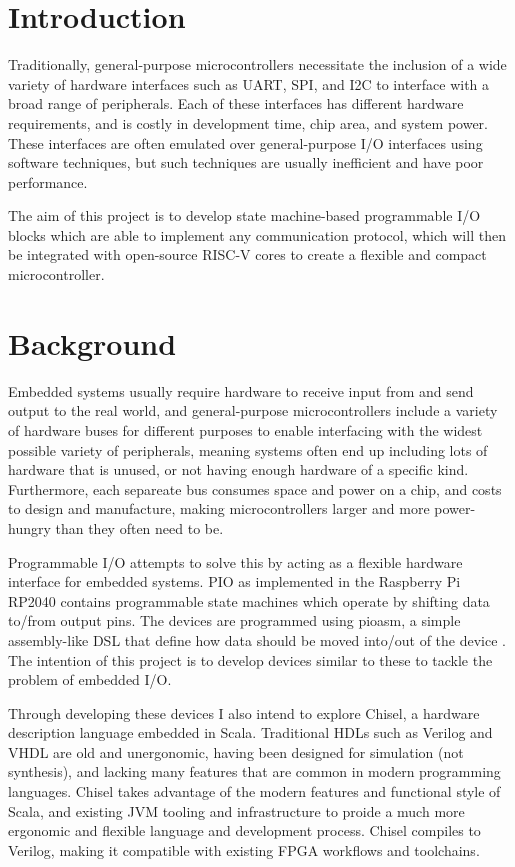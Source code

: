\documentclass[a4paper,fleqn,12pt]{article}
\begin{document}


\pagestyle{plain}

\section{Introduction}

Traditionally, general-purpose microcontrollers necessitate the inclusion of a wide variety of hardware interfaces such as UART, SPI, and I2C to interface with a broad range of peripherals. Each of these interfaces has different hardware requirements, and is costly in development time, chip area, and system power. These interfaces are often emulated over general-purpose I/O interfaces using software techniques, but such techniques are usually inefficient and have poor performance.

The aim of this project is to develop state machine-based programmable I/O blocks which are able to implement any communication protocol, which will then be integrated with open-source RISC-V cores to create a flexible and compact microcontroller.

\section{Background}

Embedded systems usually require hardware to receive input from and send output to the real world, and general-purpose microcontrollers include a variety of hardware buses for different purposes to enable interfacing with the widest possible variety of peripherals, meaning systems often end up including lots of hardware that is unused, or not having enough hardware of a specific kind. Furthermore, each separeate bus consumes space and power on a chip, and costs to design and manufacture, making microcontrollers larger and more power-hungry than they often need to be.

Programmable I/O attempts to solve this by acting as a flexible hardware interface for embedded systems. PIO as implemented in the Raspberry Pi RP2040 contains programmable state machines which operate by shifting data to/from output pins. The devices are programmed using pioasm, a simple assembly-like DSL that define how data should be moved into/out of the device \cite{rp2040}. The intention of this project is to develop devices similar to these to tackle the problem of embedded I/O.

Through developing these devices I also intend to explore Chisel, a hardware description language embedded in Scala. Traditional HDLs such as Verilog and VHDL are old and unergonomic, having been designed for simulation (not synthesis), and lacking many features that are common in modern programming languages. Chisel takes advantage of the modern features and functional style of Scala, and existing JVM tooling and infrastructure to proide a much more ergonomic and flexible language and development process. Chisel compiles to Verilog, making it compatible with existing FPGA workflows and toolchains.
\end{document}
